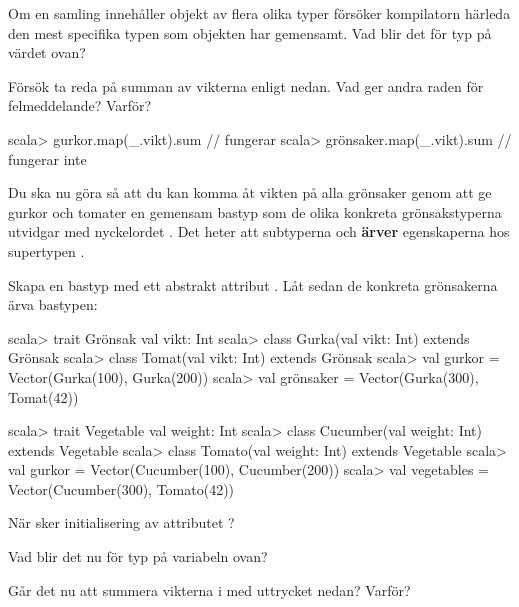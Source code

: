 \Subtask Om en samling innehåller objekt av flera olika typer försöker kompilatorn härleda den mest specifika typen som objekten har gemensamt. Vad blir det för typ på värdet \ifswedish{}\else{}\fi{} ovan?

\Subtask Försök ta reda på summan av vikterna enligt nedan. Vad ger andra raden för felmeddelande? Varför?

\begin{REPL}
scala> gurkor.map(_.vikt).sum     // fungerar
scala> grönsaker.map(_.vikt).sum  // fungerar inte
\end{REPL}

\Subtask Du ska nu göra så att du kan komma åt vikten på alla grönsaker genom att ge gurkor och tomater en gemensam bastyp som de olika konkreta grönsakstyperna utvidgar med nyckelordet . Det heter att subtyperna \ifswedish{}\else{}\fi{} och \ifswedish{}\else{}\fi \textbf{ärver} egenskaperna hos supertypen \ifswedish{}\else{}\fi.

Skapa en bastyp \ifswedish{}\else{}\fi{} med ett abstrakt attribut \ifswedish{}\else{}\fi. Låt sedan de konkreta grönsakerna ärva bastypen:

\ifswedish
\begin{REPL}
scala> trait Grönsak { val vikt: Int }
scala> class Gurka(val vikt: Int) extends Grönsak
scala> class Tomat(val vikt: Int) extends Grönsak
scala> val gurkor = Vector(Gurka(100), Gurka(200))
scala> val grönsaker = Vector(Gurka(300), Tomat(42))
\end{REPL}
\else
\begin{REPL}
scala> trait Vegetable { val weight: Int }
scala> class Cucumber(val weight: Int) extends Vegetable
scala> class Tomato(val weight: Int) extends Vegetable
scala> val gurkor = Vector(Cucumber(100), Cucumber(200))
scala> val vegetables = Vector(Cucumber(300), Tomato(42))
\end{REPL}
\fi
När sker initialisering av attributet \ifswedish{}\else{}\fi?

\Subtask Vad blir det nu för typ på variabeln \ifswedish{}\else{}\fi{} ovan?

\Subtask Går det nu att summera vikterna i \ifswedish{}\else{}\fi{} med uttrycket nedan? Varför?\\ \ifswedish{}\else{}\fi


